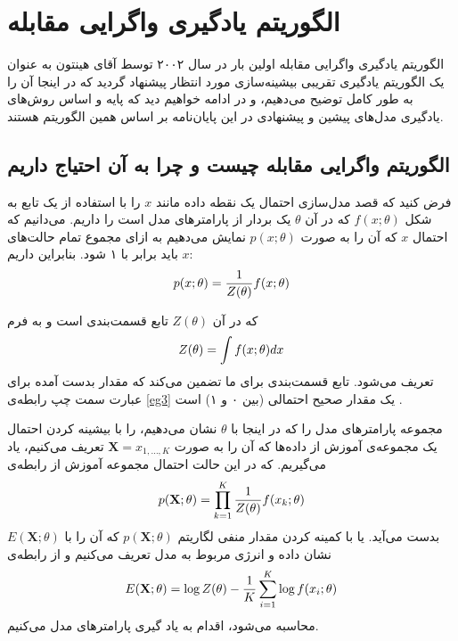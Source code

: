 \section{الگوریتم یادگیری واگرایی مقابله}
\label{chap2sec7}
الگوریتم یادگیری واگرایی مقابله
 اولین بار در سال ۲۰۰۲ توسط آقای هینتون
\cite{hinton2002training}
به عنوان یک الگوریتم یادگیری تقریبی بیشینه‌سازی مورد انتظار
پیشنهاد گردید که در اینجا آن را به طور کامل توضیح می‌‌دهیم، و در ادامه خواهیم دید که پایه و اساس روش‌های یادگیری مدل‌های پیشین و پیشنهادی در این پایان‌‌نامه بر اساس همین الگوریتم هستند.

\subsection{الگوریتم واگرایی مقابله چیست و چرا به آن احتیاج داریم}
\label{chap2sec7sub1}

فرض کنید که قصد مدل‌سازی احتمال یک نقطه داده
 مانند
$x$
را با استفاده از یک تابع به شکل
$f(x;\theta)$
که در آن
$\theta$
یک بردار از پارامتر‌های مدل است را داریم. می‌‌دانیم که احتمال
$x$
که آن را به صورت
$p(x;\theta)$
نمایش می‌‌دهیم به ازای مجموع تمام حالت‌های
$x$
باید برابر با ۱ شود. بنابراین داریم:
\begin{align}
\centering
p(x;\theta) = \dfrac{1}{Z(\theta)}f(x;\theta)
\label{eg3}
\end{align}

که در آن
$Z(\theta)$
تابع قسمت‌بندی
 است و به فرم
\begin{align}
\centering
Z(\theta) = \int f(x;\theta)dx
\label{eg4}
\end{align}
تعریف می‌شود. تابع قسمت‌بندی برای ما تضمین می‌‌کند که مقدار بدست آمده برای عبارت سمت چپ رابطه‌ی
\ref{eg3}
یک مقدار صحیح احتمالی‌ (بین ۰ و ۱) است
\cite{woodfordnotes}.

مجموعه پارامتر‌های مدل را که در اینجا با
$\theta$
نشان می‌‌دهیم، را با بیشینه کردن احتمال یک مجموعه‌‌ی آموزش
 از داده‌ها که آن را به صورت
$\textbf{X} = x_{1,...,K}$
تعریف می‌‌کنیم، یاد می‌‌گیریم. که در این حالت احتمال مجموعه آموزش از رابطه‌ی
\begin{align}
	\centering
	p(\textbf{X};\theta) = \prod_{k=1}^{K} \frac{1}{Z(\theta)} f(x_k;\theta)
	\label{eq5}
\end{align}
بدست می‌‌آید. یا با کمینه کردن مقدار منفی لگاریتم
$p(\textbf{X};\theta)$
که آن را با
$E(\textbf{X};\theta)$
نشان داده و انرژی مربوط به مدل تعریف می‌کنیم و از رابطه‌ی 
\begin{align}
	\centering
	E(\textbf{X};\theta) = \log Z(\theta) - \dfrac{1}{K} \sum_{i=1}^{K} \log f(x_i;\theta)
	\label{eq6}
\end{align}
محاسبه می‌شود، اقدام به یاد گیری پارامتر‌های مدل می‌‌کنیم.


